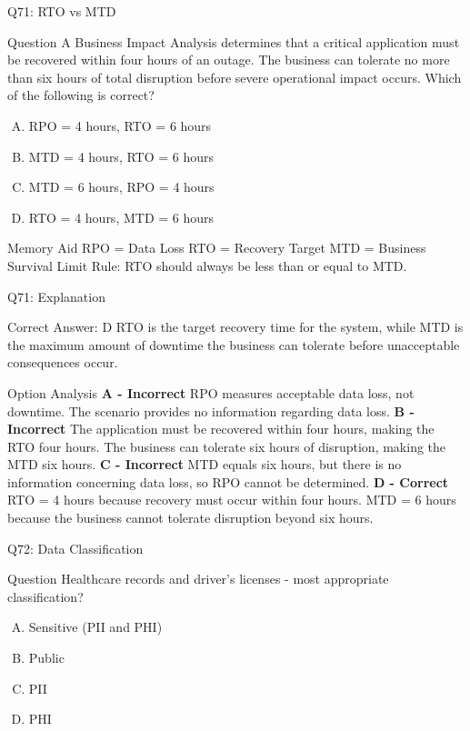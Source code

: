 \documentclass{beamer}
\begin{document}
	
	\begin{frame}{Q71: RTO vs MTD} \begin{block}{Question} A Business Impact Analysis determines that a critical application must be recovered within four hours of an outage. The business can tolerate no more than six hours of total disruption before severe operational impact occurs. Which of the following is correct? \end{block} \begin{enumerate}[(A)] \item RPO = 4 hours, RTO = 6 hours \item MTD = 4 hours, RTO = 6 hours \item MTD = 6 hours, RPO = 4 hours \item RTO = 4 hours, MTD = 6 hours \end{enumerate} \begin{block}{Memory Aid} RPO = Data Loss RTO = Recovery Target MTD = Business Survival Limit Rule: RTO should always be less than or equal to MTD. \end{block} \end{frame} \begin{frame}{Q71: Explanation} \footnotesize \begin{block}{Correct Answer: D} RTO is the target recovery time for the system, while MTD is the maximum amount of downtime the business can tolerate before unacceptable consequences occur. \end{block} \begin{block}{Option Analysis} \textbf{A - Incorrect} RPO measures acceptable data loss, not downtime. The scenario provides no information regarding data loss. \vspace{0.15cm} \textbf{B - Incorrect} The application must be recovered within four hours, making the RTO four hours. The business can tolerate six hours of disruption, making the MTD six hours. \vspace{0.15cm} \textbf{C - Incorrect} MTD equals six hours, but there is no information concerning data loss, so RPO cannot be determined. \vspace{0.15cm} \textbf{D - Correct} RTO = 4 hours because recovery must occur within four hours. MTD = 6 hours because the business cannot tolerate disruption beyond six hours. \end{block}  \end{frame}
	
	\begin{frame}{Q72: Data Classification}
		\begin{block}{Question}
			Healthcare records and driver's licenses - most appropriate classification?
		\end{block}
		\begin{enumerate}[(A)]
			\item Sensitive (PII and PHI)
			\item Public
			\item PII
			\item PHI
		\end{enumerate}
	\end{frame}
	
\end{document}
